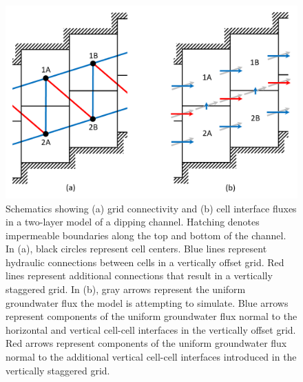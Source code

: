 \documentclass{article}
\begin{document}
\begin{figure}
	\begin{center}
	\includegraphics[scale=0.6]{../figures/schem_conn_area_flux.png}
	\caption{Schematics showing (a) grid connectivity and (b) cell interface fluxes in a two-layer model of a dipping channel. Hatching denotes impermeable boundaries along the top and bottom of the channel. In (a), black circles represent cell centers. Blue lines represent hydraulic connections between cells in a vertically offset grid. Red lines represent additional connections that result in a vertically staggered grid. In (b), gray arrows represent the uniform groundwater flux the model is attempting to simulate. Blue arrows represent components of the uniform groundwater flux normal to the horizontal and vertical cell-cell interfaces in the vertically offset grid. Red arrows represent components of the uniform groundwater flux normal to the additional vertical cell-cell interfaces introduced in the vertically staggered grid.}
	\label{fig:schem-conn-area-flux}
	\end{center}
\end{figure}
\end{document}
